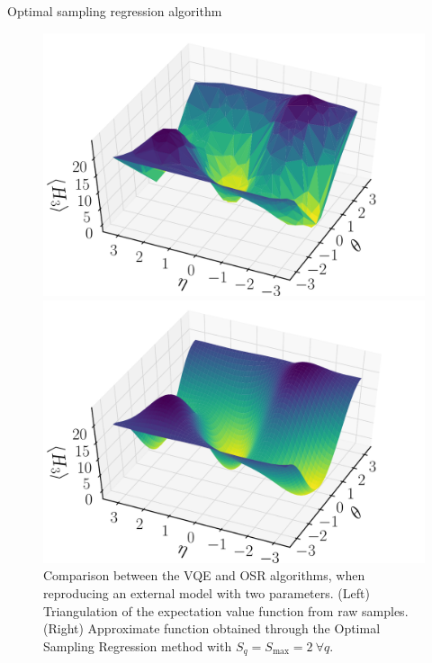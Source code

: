 \documentclass[9pt, handout, aspectratio=169]{beamer}	%
\begin{document}
\begin{frame}[allowframebreaks]{Optimal sampling regression algorithm}
\begin{figure}[!tbp]
	\centering
	\begin{minipage}[c]{.40\linewidth}
		\centering
		\includegraphics[width=\linewidth]{Figures/NJL1-model-solving/deuteron-VQE}
	\end{minipage}
	\hspace{.025\linewidth}
	\begin{minipage}[c]{.40\linewidth}
		\centering
		\includegraphics[width=\linewidth]{Figures/NJL1-model-solving/deuteron-OSR}
	\end{minipage}
	\caption{Comparison between the VQE and OSR algorithms, when reproducing an external model with two parameters. (Left) Triangulation of the expectation value function from raw samples. (Right) Approximate function obtained through the Optimal Sampling Regression method with $S_q=S_{\text{max}}=2 ~\forall q$.}
\end{figure}


\end{frame}
\end{document}
